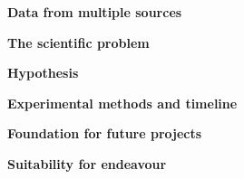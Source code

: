 \documentclass[a4paper,10pt,twocolumn]{article}
\newcommand{\hdg}[1] {\noindent \textbf{#1} }
\begin{document}
\hdg{Data from multiple sources}

\hdg{The scientific problem}

\hdg{Hypothesis}

\hdg{Experimental methods and timeline}

\hdg{Foundation for future projects}

\hdg{Suitability for endeavour}

% 
% 
% 
% 
% 
% 
% 
% 



\vspace{-1em}
% 
{ \footnotesize }

\end{document}
